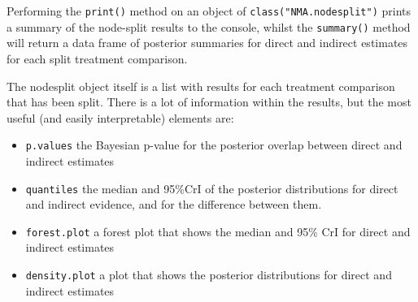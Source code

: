\documentclass[]{article}
\newenvironment{Shaded}{\begin{snugshade}}{\end{snugshade}}
\newcommand{\CommentTok}[1]{\textcolor[rgb]{0.56,0.35,0.01}{\textit{#1}}}
\newcommand{\KeywordTok}[1]{\textcolor[rgb]{0.13,0.29,0.53}{\textbf{#1}}}
\newcommand{\NormalTok}[1]{#1}
\providecommand{\tightlist}{%
  \setlength{\itemsep}{0pt}\setlength{\parskip}{0pt}}
\begin{document}
\begin{Shaded}
\end{Shaded}

Performing the \texttt{print()} method on an object of
\texttt{class("NMA.nodesplit")} prints a summary of the node-split
results to the console, whilst the \texttt{summary()} method will return
a data frame of posterior summaries for direct and indirect estimates
for each split treatment comparison.

The nodesplit object itself is a list with results for each treatment
comparison that has been split. There is a lot of information within the
results, but the most useful (and easily interpretable) elements are:

\begin{itemize}
\tightlist
\item
  \texttt{p.values} the Bayesian p-value for the posterior overlap
  between direct and indirect estimates
\item
  \texttt{quantiles} the median and 95\%CrI of the posterior
  distributions for direct and indirect evidence, and for the difference
  between them.
\item
  \texttt{forest.plot} a forest plot that shows the median and 95\% CrI
  for direct and indirect estimates
\item
  \texttt{density.plot} a plot that shows the posterior distributions
  for direct and indirect estimates
\end{itemize}
\end{document}

